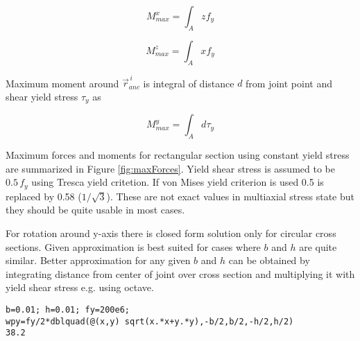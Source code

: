 \begin{equation} \label{eq:Mx}
M_{max}^x= \int_A z f_y
\end{equation}

\begin{equation} \label{eq:Mz}
M_{max}^z= \int_A x f_y
\end{equation}

Maximum moment around $\vec{r}_{anc}^{\,i} $
is integral of distance $d$ from joint point
and shear yield stress $\tau_y$ as 

\begin{equation} \label{eq:My}
M_{max}^y= \int_A d \tau_y
\end{equation}

Maximum forces and moments for 
rectangular section using constant yield stress
are summarized in Figure \ref{fig:maxForces}.
Yield shear stress is assumed to be $ 0.5\, f_y$ using Tresca yield critetion.
If von Mises yield criterion is used 0.5 is replaced by 0.58 ($1/\sqrt{3}$).
These are not exact values in multiaxial stress state but they
should be quite usable in most cases.

For rotation around y-axis there is closed form solution only for
circular cross sections.
Given approximation is 
best suited for cases where $b$ and $h$ are quite similar.
Better approximation for any given $b$ and $h$ can be obtained 
by integrating distance from center of joint over cross section and
multiplying it with yield shear stress e.g. using octave.

\lstset{language=octave}
\begin{lstlisting}
b=0.01; h=0.01; fy=200e6;
wpy=fy/2*dblquad(@(x,y) sqrt(x.*x+y.*y),-b/2,b/2,-h/2,h/2)
38.2
\end{lstlisting}


